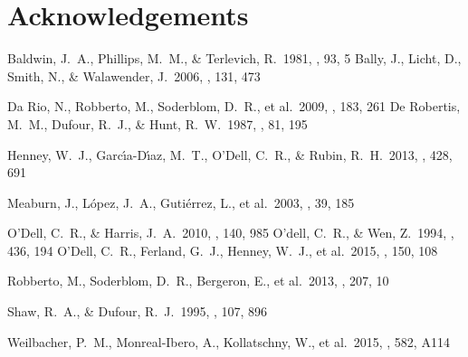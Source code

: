 \documentclass[a4paper,fleqn,usenatbib]{mnras}     %
\begin{document}
\section*{Acknowledgements}    



%


\begin{thebibliography}{99}
 Baldwin, J.~A., Phillips, M.~M., \& Terlevich, R.\ 1981, \pasp, 93, 5 
 Bally, J., Licht, D., Smith, N., \& Walawender, J.\ 2006, \aj, 131, 473  

 Da Rio, N., Robberto, M., Soderblom, D.~R., et al.\ 2009, \apjs, 183, 261 
 De Robertis, M.~M., Dufour, R.~J., \& Hunt, R.~W.\ 1987, \jrasc, 81, 195 

 Henney, W.~J., Garc{\'{\i}}a-D{\'{\i}}az, M.~T., O'Dell, C.~R., \& Rubin, R.~H.\ 2013, \mnras, 428, 691 

 Meaburn, J., L{\'o}pez, J.~A., Guti{\'e}rrez, L., et al.\ 2003, \rmxaa, 39, 185 

 O'Dell, C.~R., \& Harris, J.~A.\ 2010, \aj, 140, 985  
 O'dell, C.~R., \& Wen, Z.\ 1994, \apj, 436, 194  
 O'Dell, C.~R., Ferland, G.~J., Henney, W.~J., et al.\ 2015, \aj, 150, 108 

 Robberto, M., Soderblom, D.~R., Bergeron, E., et al.\ 2013, \apjs, 207, 10 

 Shaw, R.~A., \& Dufour, R.~J.\ 1995, \pasp, 107, 896  

 Weilbacher, P.~M., Monreal-Ibero, A., Kollatschny, W., et al.\ 2015, \aap, 582, A114  


\end{thebibliography}














\bsp	%
\label{lastpage}
\end{document}
